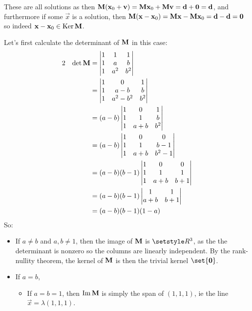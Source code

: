 \documentclass[fleqn,a4paper,11pt]{article}
\begin{document}
\begin{enumerate}[label=\textbf{\arabic*.}]
   These are all solutions as then
   \(\mathbf{M}(\mathrm{\mathbf{x}}_0 + \mathrm{\mathbf{v}})
     = \mathbf{M} \mathrm{\mathbf{x}}_0 + \mathbf{M} \mathrm{\mathbf{v}}
     = \mathrm{\mathbf{d}} + \mathrm{\mathbf{0}} = \mathrm{\mathbf{d}}\), and furthermore if some
   \(\vec x\) is a solution, then
   \(\mathbf{M}(\mathrm{\mathbf{x}} - \mathrm{\mathbf{x}}_0)
     = \mathbf{M} \mathrm{\mathbf{x}} - \mathbf{M} \mathrm{\mathbf{x}}_0
     = \mathrm{\mathbf{d}} - \mathrm{\mathbf{d}}
     = \mathrm{\mathbf{0}}\)
   so indeed \(\mathrm{\mathbf{x}} - \mathrm{\mathbf{x}}_0 \in \operatorname{Ker} \mathbf{M}\).

   Let's first calculate the determinant of \(\mathbf{M}\) in this case:
   \begin{alignat*}2
    &&\det \mat M &=
    \begin{vmatrix}
     1 & 1 & 1 \\
     1 & a & b \\
     1 & a^2 & b^2
    \end{vmatrix} \\
    && &= \begin{vmatrix}
     1 & 0 & 1 \\
     1 & a - b & b \\
     1 & a^2 - b^2 & b^2
    \end{vmatrix} \\
    && &= (a - b)\begin{vmatrix}
     1 & 0 & 1 \\
     1 & 1 & b \\
     1 & a + b & b^2
    \end{vmatrix} \\
    && &= (a - b)\begin{vmatrix}
     1 & 0 & 0 \\
     1 & 1 & b - 1 \\
     1 & a + b & b^2 - 1
    \end{vmatrix} \\
    && &= (a - b)(b - 1)\begin{vmatrix}
     1 & 0 & 0 \\
     1 & 1 & 1 \\
     1 & a + b & b + 1
    \end{vmatrix} \\
    && &= (a - b)(b - 1)\begin{vmatrix}
     1 & 1 \\
     a + b & b + 1
    \end{vmatrix} \\
    && &= (a - b)(b - 1)(1 - a)
   \end{alignat*}
   So:
   \begin{itemize}
    \item
     If \(a \ne b\) and \(a, b \ne 1\), then the image of \(\mathbf{M}\) is
     \(\Reals^3\), as the the determinant is nonzero so the columns are linearly
     independent. By the rank-nullity theorem, the kernel of \(\mathbf{M}\) is then
     the trivial kernel \(\set{\vec 0}\).
    \item
     If \(a = b\),
     \begin{itemize}
      \item
       If \(a = b = 1\), then \(\operatorname{Im} \mathbf{M}\) is simply the span of
       \((1, 1, 1)\), ie the line \(\vec x = \lambda(1, 1, 1)\).


\end{itemize}
\end{itemize}
\end{enumerate}
\end{document}
